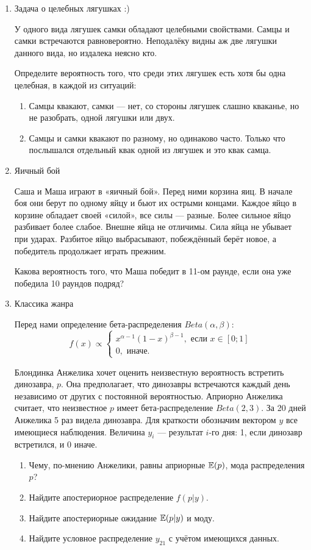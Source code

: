 \documentclass[12pt, a4paper]{article}\usepackage[]{graphicx}\usepackage[]{color}
\begin{document}
		\begin{enumerate}

			\item Задача о целебных лягушках :)

			У одного вида лягушек самки обладают целебными свойствами. Самцы и самки встречаются равновероятно. Неподалёку видны аж две лягушки данного вида, но издалека неясно кто.

			Определите вероятность того, что среди этих лягушек есть хотя бы одна целебная, в каждой из ситуаций:
			\begin{enumerate}
				\item Самцы квакают, самки — нет, со стороны лягушек слашно кваканье, но не разобрать, одной лягушки или двух.
				\item Самцы и самки квакают по разному, но одинаково часто. Только что послышался отдельный квак одной из лягушек и это квак самца.
			\end{enumerate}

			\item Яичный бой

			Саша и Маша играют в «яичный бой». Перед ними корзина яиц. В начале боя они берут по одному яйцу и бьют их острыми концами. Каждое яйцо в корзине обладает своей «силой», все силы — разные. Более сильное яйцо разбивает более слабое. Внешне яйца не отличимы. Сила яйца не убывает при ударах. Разбитое яйцо выбрасывают, побеждённый берёт новое, а победитель продолжает играть прежним.

			Какова вероятность того, что Маша победит в 11-ом раунде, если она уже победила 10 раундов подряд?

			\item Классика жанра

			Перед нами определение бета-распределения $Beta(\alpha, \beta)$:
			\[
			f(x) \propto \begin{cases}
			x^{\alpha-1}(1-x)^{\beta-1}, \text{ если } x\in[0;1] \\
			0, \text{ иначе.}
			\end{cases}
			\]

			Блондинка Анжелика хочет оценить неизвестную вероятность встретить динозавра, $p$. Она предполагает, что динозавры встречаются каждый день независимо от других с постоянной вероятностью. Априорно Анжелика считает, что неизвестное $p$ имеет бета-распределение $Beta(2, 3)$. За 20 дней Анжелика 5 раз видела динозавра. Для краткости обозначим вектором $y$ все имеющиеся наблюдения. Величина $y_i$ — результат $i$-го дня: 1, если динозавр встретился, и 0 иначе.
			\begin{enumerate}
				\item Чему, по-мнению Анжелики, равны априорные $\mathbb{E}(p)$, мода распределения $p$?
				\item Найдите апостериорное распределение $f(p|y)$.
				\item Найдите апостериорные ожидание $\mathbb{E}(p|y)$ и моду.
				\item Найдите условное распределение $y_{21}$ с учётом имеющихся данных.
			\end{enumerate}


\end{enumerate}
\end{document}

